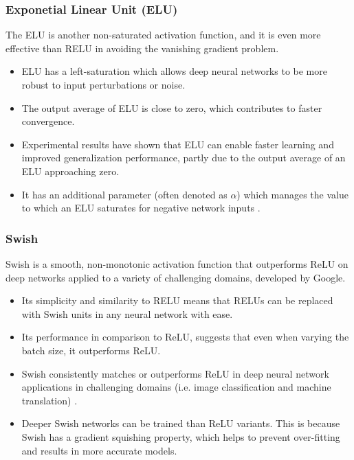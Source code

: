 \subsubsection{Exponetial Linear Unit (ELU)}

The \gls{ELU} is another non-saturated activation function, and it is even more effective than \gls{RELU} in avoiding the vanishing gradient problem.

\begin{itemize}
    \item \gls{ELU} has a left-saturation which allows deep neural networks to be more robust to input perturbations or noise.
    \item The output average of \gls{ELU} is close to zero, which contributes to faster convergence.
    \item Experimental results have shown that \gls{ELU} can enable faster learning and improved generalization performance, partly due to the output average of an \gls{ELU} approaching zero.
    \item It has an additional parameter (often denoted as $\alpha$) which manages the value to which an \gls{ELU} saturates for negative network inputs \cite{Maas2013}.
\end{itemize}

\subsubsection{Swish}\label{ssec:swish}

Swish is a smooth, non-monotonic activation function that outperforms ReLU on deep networks applied to a variety of challenging domains, developed by Google. 

\begin{itemize}
    \item Its simplicity and similarity to \gls{RELU} means that \glspl{RELU} can be replaced with Swish units in any neural network with ease.
    \item Its performance in comparison to ReLU, suggests that even when varying the batch size, it outperforms ReLU.
    \item Swish consistently matches or outperforms ReLU in deep neural network applications in challenging domains (i.e. image classification and machine translation) \cite{Ramachandran2017}.
    \item Deeper Swish networks can be trained than ReLU variants. This is because Swish has a gradient squishing property, which helps to prevent over-fitting and results in more accurate models. 
\end{itemize}

